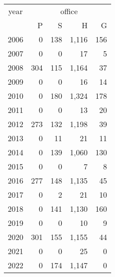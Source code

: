 \footnotesize\begin{tabular}[t]{lrrrr}
\toprule
\multicolumn{1}{c}{year} & \multicolumn{4}{c}{office} \\
\cmidrule(l{3pt}r{3pt}){1-1} \cmidrule(l{3pt}r{3pt}){2-5}
  & P & S & H & G\\
\midrule
2006 & 0 & 138 & 1,116 & 156\\
2007 & 0 & 0 & 17 & 5\\
2008 & 304 & 115 & 1,164 & 37\\
2009 & 0 & 0 & 16 & 14\\
2010 & 0 & 180 & 1,324 & 178\\
2011 & 0 & 0 & 13 & 20\\
2012 & 273 & 132 & 1,198 & 39\\
2013 & 0 & 11 & 21 & 11\\
2014 & 0 & 139 & 1,060 & 130\\
2015 & 0 & 0 & 7 & 8\\
2016 & 277 & 148 & 1,135 & 45\\
2017 & 0 & 2 & 21 & 10\\
2018 & 0 & 141 & 1,130 & 160\\
2019 & 0 & 0 & 10 & 9\\
2020 & 301 & 155 & 1,155 & 44\\
2021 & 0 & 0 & 25 & 0\\
2022 & 0 & 174 & 1,147 & 0\\
\bottomrule
\end{tabular}

